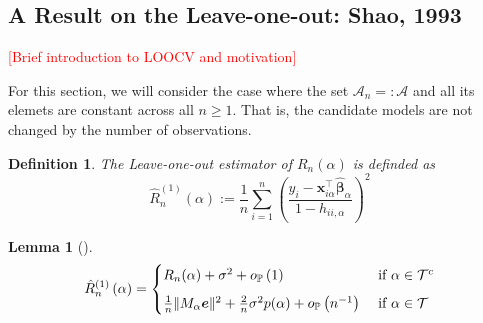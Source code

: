 \documentclass[12pt, letter paper]{article}
\newcommand{\1}{\mathmybb{1}}
\newtheorem{definition}{Definition}[section]
\newtheorem{lemma}[proposition]{Lemma}
\newcommand{\0}{\emptyset}
\newcommand{\prob}{\mathbb{P}}
\newcommand{\paren}[1]{\left(#1 \right)}
\newcommand{\norm}[1]{|\hspace{-1pt}|#1 |\hspace{-1pt}|}
\newcommand{\normsq}[1]{\norm{#1}^{2}}
\newcommand{\Acal}{\mathcal{A}_{n}}
\newcommand{\Tcal}{\mathcal{T}_{n}}
\newcommand{\x}{\boldsymbol{x}}
\newcommand{\e}{\boldsymbol{e}}
\newcommand{\bbetahat}{\boldsymbol{\hat{\beta}}}
\newcommand{\loocv}[1]{\hat{R}^{(1)}_{n}\paren{#1}}
\newcommand{\op}[1]{o_{\prob}\paren{#1}}
\begin{document}
\subsection{A Result on the Leave-one-out: Shao, 1993}
\renewcommand{\Acal}{\mathcal{A}}
\renewcommand{\Tcal}{\mathcal{T}}
\textcolor{red}{[Brief introduction to LOOCV and motivation]}

For this section, we will consider the case where the set \(\Acal_{n}=:\Acal\) and all its elemets are constant across all \(n\geq 1\). That is, the candidate models are not changed by the number of observations.
\begin{definition}
    The Leave-one-out estimator of \(R_{n}(\alpha)\) is definded as
    \[\loocv{\alpha}:= \frac{1}{n}\sum_{i=1}^{n}\paren{\frac{y_{i}-\x_{i\alpha}^{\top}\bbetahat_{\alpha}}{1-h_{ii,\alpha}}}^{2}\]
\end{definition}

\begin{lemma}[\cite{shao_1993}]\label{lem:lemmadecomp}
    \begin{equation}\label{eq:lemmadecomp}
    \loocv{\alpha} = \begin{cases}
        R_{n}(\alpha) + \sigma^{2} + \op{1} &\text{ if }\alpha\in\Tcal^{c}\\[2mm]
        \frac{1}{n}\normsq{M_{\alpha}\e} + \frac{2}{n}\sigma^{2}p(\alpha) + \op{n^{-1}} &\text{ if }\alpha\in\Tcal
    \end{cases}
    \end{equation}
\end{lemma}
\end{document}
